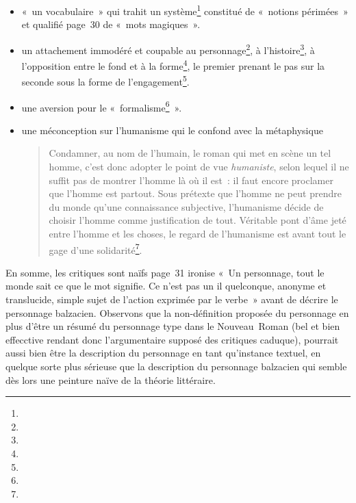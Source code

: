 \documentclass[12pt, a4paper]{article}
\begin{document}
\begin{itemize}
    \item «~un vocabulaire~» qui trahit un système\footnote{} constitué de «~notions périmées~» et qualifié page~30 de «~mots magiques~».
    \item un attachement immodéré et coupable au personnage\footnote{}, à l'histoire\footnote{}, à l'opposition entre le fond et à la forme\footnote{}, le premier prenant le pas sur la seconde sous la forme de l'engagement\footnote{}.
    \item une aversion pour le «~formalisme\footnote{}~».
    \item une méconception sur l'humanisme qui le confond avec la métaphysique
    \begin{quote}
        Condamner, au nom de l’humain, le roman qui met en scène un tel homme, c’est donc adopter le point de vue \textit{humaniste}, selon lequel il ne suffit pas de montrer l’homme là où il est~: il faut encore proclamer que l’homme est partout. Sous prétexte que l’homme ne peut prendre du monde qu’une connaissance subjective, l’humanisme décide de choisir l’homme comme justification de tout. Véritable pont d’âme jeté entre l’homme et les choses, le regard de l’humanisme est avant tout le gage d’une solidarité\footnote{}.
    \end{quote} 
\end{itemize}

En somme, les critiques sont naïfs page~31 \robbe{} ironise «~Un personnage, tout le monde sait ce que le mot signifie. Ce n’est pas un il quelconque, anonyme et translucide, simple sujet de l’action exprimée par le verbe~» avant de décrire le personnage balzacien. Observons que la non-définition proposée du personnage en plus d'être un résumé du personnage type dans le Nouveau~Roman (bel et bien effecctive rendant donc l'argumentaire supposé des critiques caduque), pourrait aussi bien être la description du personnage en tant qu'instance textuel, en quelque sorte plus sérieuse que la description du personnage balzacien qui semble dès lors une peinture naïve de la théorie littéraire. %
\end{document}
